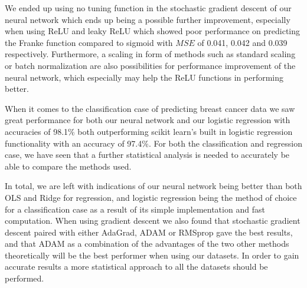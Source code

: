 \documentclass[11pt]{article}
\begin{document}
We ended up using no tuning function in the stochastic gradient descent of our neural network which ends up being a possible further improvement, especially when using ReLU and leaky ReLU which showed poor performance on predicting the Franke function compared to sigmoid with $MSE$ of 0.041, 0.042 and 0.039 respectively. Furthermore, a scaling in form of methods such as standard scaling or batch normalization are also possibilities for performance improvement of the neural network, which especially may help the ReLU functions in performing better.

When it comes to the classification case of predicting breast cancer data we saw great performance for both our neural network and our logistic regression with accuracies of 98.1\% both outperforming scikit learn's built in logistic regression functionality with an accuracy of 97.4\%. For both the classification and regression case, we have seen that a further statistical analysis is needed to accurately be able to compare the methods used.

In total, we are left with indications of our neural network being better than both OLS and Ridge for regression, and logistic regression being the method of choice for a classification case as a result of its simple implementation and fast computation. When using gradient descent we also found that stochastic gradient descent paired with either AdaGrad, ADAM or RMSprop gave the best results, and that ADAM as a combination of the advantages of the two other methods theoretically will be the best performer when using our datasets. In order to gain accurate results a more statistical approach to all the datasets should be performed.
\nocite{nielsen}
\nocite{Mehta_2019}
\nocite{hastie}
\printbibliography
\end{document}
